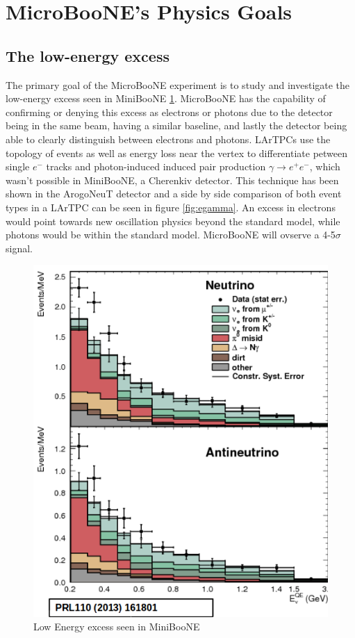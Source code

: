\section{MicroBooNE's Physics Goals} 
\subsection{The low-energy excess}
The primary goal of the MicroBooNE experiment is to study and investigate the low-energy excess seen in MiniBooNE \ref{fig:lee}. MicroBooNE has the capability of confirming or denying this excess as electrons or photons due to the detector being in the same beam, having a similar baseline, and lastly the detector being able to clearly distinguish between electrons and photons. LArTPCs use the topology of events as well as energy loss near the vertex to differentiate petween single $e^-$ tracks and photon-induced induced pair production $\gamma \rightarrow e^+e^-$, which wasn't possible in MiniBooNE, a Cherenkiv detector. This technique has been shown in the ArogoNeuT detector\cite{argoneut} and a side by side comparison of both event types in a LArTPC can be seen in figure \ref{fig:egamma}. An excess in electrons would point towards new oscillation physics beyond the standard model, while photons would be within the standard model. MicroBooNE will ovserve a 4-5$\sigma$ signal.  

\begin{figure}[htp!]
\centering
\includegraphics[width=.5\textwidth]{figs/lee.png}
\caption{Low Energy excess seen in MiniBooNE}
\label{fig:lee}
\end{figure}

